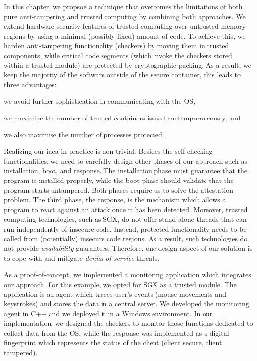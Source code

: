 In this chapter, we propsoe a technique that overcomes the limitations of both 
pure anti-tampering and trusted computing by combining both approaches.
We extend hardware security features of trusted computing over untrusted memory 
regions by using a minimal (possibly fixed) amount of code.
To achieve this, we harden anti-tampering functionality (\eg checkers) by 
moving them in trusted components, while critical code segments
(which invoke the checkers stored within a trusted module) are protected by 
cryptographic packing.
As a result, we keep the majority of the software outside of the secure 
container, this leads to three advantages:
\begin{enumerate*}[label=(\roman*)]
	\item we avoid further sophistication in communicating with the OS,
	\item we maximize the number of trusted containers issued 
	contemporaneously, and 
	\item we also maximise the number of processes protected.
\end{enumerate*}

Realizing our idea in practice is non-trivial.
Besides the self-checking functionalities, we need to carefully design other
phases of our approach such as installation, boot, and response.
The installation phase must guarantee that the program is installed properly, 
while 
the boot phase should validate that the program starts untampered. Both phases 
require us to solve the attestation problem.
The third phase, the response, is the mechanism which allows a program to 
react against an attack once it has been detected.
Moreover, trusted computing technologies, such as SGX, do not offer stand-alone 
threads 
that can run independently of insecure code. Instead, protected functionality 
needs 
to be called from (potentially) insecure code regions. As a result, such 
technologies  
do not provide \emph{availability} guarantees. 
Therefore, one design aspect of our solution is to cope with and mitigate 
\emph{denial of service} threats.

As a proof-of-concept, we implemented a monitoring application
which integrates our approach. 
For this example, we opted for SGX as a trusted module. 
The application is an agent which traces user's events (\ie mouse movements 
and keystrokes) and stores the data in a central server.
We developed the monitoring agent in C++ and we deployed it in a Windows 
environment.
In our implementation, we designed the checkers to monitor those
functions dedicated to collect data from the OS, while the response was 
implemented as a 
digital fingerprint which represents the status of the client 
(\ie client secure, client tampered).

